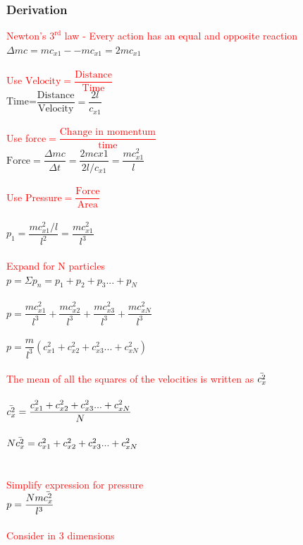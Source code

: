 \documentclass[12pt]{article}
\begin{document}
\subsubsection{Derivation}
\textcolor{red}{Newton's $3^{\text{rd}}$ law - Every action has an equal and opposite reaction}\\
$\Delta mc=mc_{x1}--mc_{x1}=2mc_{x1}$\\
\\
\textcolor{red}{Use $\text{Velocity}=\dfrac{\text{Distance}}{\text{Time}}$}\\
Time=$\dfrac{\text{Distance}}{\text{Velocity}}=\dfrac{2l}{c_{x1}}$\\
\\
\textcolor{red}{Use force$=\dfrac{\text{Change in momentum}}{\text{time}}$}\\
$\text{Force}=\dfrac{\Delta mc}{\Delta t}=\dfrac{2mc{x1}}{2l/c_{x1}}=\dfrac{mc_{x1}^2}{l}$\\
\\
\textcolor{red}{Use Pressure$=\dfrac{\text{Force}}{\text{Area}}$}\\
\\
$p_1=\dfrac{mc_{x1}^2/l}{l^2}=\dfrac{mc_{x1}^2}{l^3}$\\
\\
\textcolor{red}{Expand for N particles}\\
$p=\Sigma p_n=p_1+p_2+p_3...+p_N$\\
\\
$p=\dfrac{mc_{x1}^2}{l^3}+\dfrac{mc_{x2}^2}{l^3}+\dfrac{mc_{x3}^2}{l^3}+\dfrac{mc_{xN}^2}{l^3}$\\
\\
$p=\dfrac{m}{l^3}(c_{x1}^2+c_{x2}^2+c_{x3}^2...+c_{xN}^2)$\\
\\
\textcolor{red}{The mean of all the squares of the velocities is written as $\mathlarger{\bar{c_x^2}}$}\\
\\
$\mathlarger{\bar{c_x^2}}=\dfrac{c_{x1}^2+c_{x2}^2+c_{x3}^2...+c_{xN}^2}{N}$\\
\\
$N\mathlarger{\bar{c_x^2}}=c_{x1}^2+c_{x2}^2+c_{x3}^2...+c_{xN}^2$\\
\\
\\
\textcolor{red}{Simplify expression for pressure}\\
$p=\dfrac{Nm\mathlarger{\bar{c_x^2}}}{l^3}$\\
\\
\textcolor{red}{Consider in 3 dimensions}\\
\end{document}

